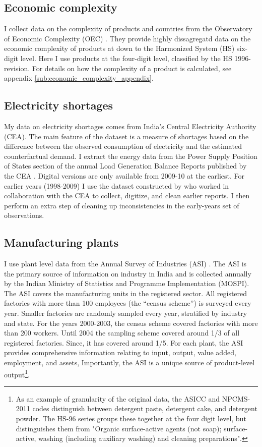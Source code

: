 \documentclass[11pt]{article}
\begin{document}
\subsection{Economic complexity}%
\label{sub:international_trade_data}
I collect data on the complexity of products and countries from the Observatory of Economic Complexity (OEC) \citep{simoes_economic_2011}. They provide highly dissagregatd data on the economic complexity of products at down to the Harmonized System (HS) six-digit level. Here I use products at the four-digit level, classified by the HS 1996-revision. For details on how the complexity of a product is calculated, see appendix \ref{sub:economic_complexity_appendix}.

\subsection{Electricity shortages}%
\label{sub:energy_data}
My data on electricity shortages comes from India's Central Electricity Authority (CEA). The main feature of the dataset is a measure of shortages based on the difference between the observed consumption of electricity and the estimated counterfactual demand. I extract the energy data from the Power Supply Position of States section of the annual Load Generation Balance Reports published by the CEA \citep{cea_load_2009}. Digital versions are only available from 2009-10 at the earliest. For earlier years (1998-2009) I use the dataset constructed by \cite{allcott_how_2016} who worked in collaboration with the CEA to collect, digitize, and clean earlier reports. I then perform an extra step of cleaning up inconsistencies in the early-years set of observations.

\subsection{Manufacturing plants}%
\label{sub:plant_data}
I use plant level data from the Annual Survey of Industries (ASI) \citep{mospi_annual_2000-1}. The ASI is the primary source of information on industry in India and is collected annually by the Indian Ministry of Statistics and Programme Implementation (MOSPI). The ASI covers the manufacturing units in the registered sector. All registered factories with more than 100 employees (the ``census scheme'') is surveyed every year. Smaller factories are randomly sampled every year, stratified by industry and state. For the years 2000-2003, the census scheme covered factories with more than 200 workers. Until 2004 the sampling scheme covered around 1/3 of all registered factories. Since, it has covered around 1/5. For each plant, the ASI provides comprehensive information relating to input, output, value added, employment, and assets, Importantly, the ASI is a unique source of product-level output\footnote{As an example of granularity of the original data, the ASICC and NPCMS-2011 codes distinguish between detergent paste, detergent cake, and detergent powder. The HS-96 series groups these together at the four digit level, but distinguishes them from "Organic surface-active agents (not soap); surface-active, washing (including auxiliary washing) and cleaning preparations".}.
\end{document}
